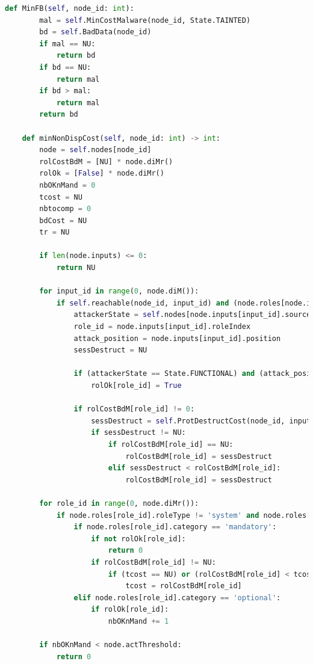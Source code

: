 \documentclass[a4paper]{article}
\begin{document}
\begin{appendices}
\begin{lstlisting}[language=python]
    def MinFB(self, node_id: int):
        mal = self.MinCostMalware(node_id, State.TAINTED)
        bd = self.BadData(node_id)
        if mal == NU:
            return bd
        if bd == NU:
            return mal
        if bd > mal:
            return mal
        return bd

    def minNonDispCost(self, node_id: int) -> int:
        node = self.nodes[node_id]
        rolCostBdM = [NU] * node.diMr()
        rolOk = [False] * node.diMr()
        nbOKnMand = 0
        tcost = NU
        nbtocomp = 0
        bdCost = NU
        tr = NU

        if len(node.inputs) <= 0:
            return NU

        for input_id in range(0, node.diM()):
            if self.reachable(node_id, input_id) and (node.roles[node.inputs[input_id].roleIndex].category != 'transparent') and (node.roles[node.inputs[input_id].roleIndex].roleType != 'system'):
                attackerState = self.nodes[node.inputs[input_id].sourceNodeIndex].current
                role_id = node.inputs[input_id].roleIndex
                attack_position = node.inputs[input_id].position
                sessDestruct = NU

                if (attackerState == State.FUNCTIONAL) and (attack_position == 'peer'): 
                    rolOk[role_id] = True

                if rolCostBdM[role_id] != 0:
                    sessDestruct = self.ProtDestructCost(node_id, input_id, role_id, node.inputs[input_id].sourceNodeIndex, attack_position)
                    if sessDestruct != NU:
                        if rolCostBdM[role_id] == NU:
                            rolCostBdM[role_id] = sessDestruct
                        elif sessDestruct < rolCostBdM[role_id]:
                            rolCostBdM[role_id] = sessDestruct 

        for role_id in range(0, node.diMr()):
            if node.roles[role_id].roleType != 'system' and node.roles[role_id].category != 'transparent':
                if node.roles[role_id].category == 'mandatory':
                    if not rolOk[role_id]:
                        return 0
                    if rolCostBdM[role_id] != NU:
                        if (tcost == NU) or (rolCostBdM[role_id] < tcost):
                            tcost = rolCostBdM[role_id]
                elif node.roles[role_id].category == 'optional':
                    if rolOk[role_id]:
                        nbOKnMand += 1

        if nbOKnMand < node.actThreshold:
            return 0


\end{lstlisting}
\end{appendices}
\end{document}
